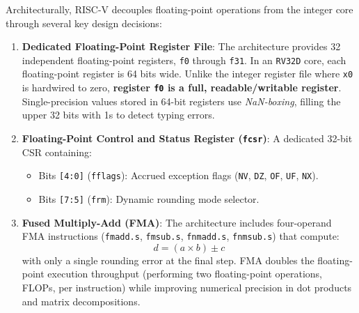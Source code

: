 Architecturally, RISC-V decouples floating-point operations from the integer core through several key design decisions:
\begin{enumerate}
    \item \textbf{Dedicated Floating-Point Register File}: The architecture provides 32 independent floating-point registers, \texttt{f0} through \texttt{f31}. In an \texttt{RV32D} core, each floating-point register is 64 bits wide. Unlike the integer register file where \texttt{x0} is hardwired to zero, \textbf{register \texttt{f0} is a full, readable/writable register}. Single-precision values stored in 64-bit registers use \emph{NaN-boxing}, filling the upper 32 bits with 1s to detect typing errors.
    \item \textbf{Floating-Point Control and Status Register (\texttt{fcsr})}: A dedicated 32-bit CSR containing:
    \begin{itemize}
        \item Bits \texttt{[4:0]} (\texttt{fflags}): Accrued exception flags (\texttt{NV}, \texttt{DZ}, \texttt{OF}, \texttt{UF}, \texttt{NX}).
        \item Bits \texttt{[7:5]} (\texttt{frm}): Dynamic rounding mode selector.
    \end{itemize}
    \item \textbf{Fused Multiply-Add (FMA)}: The architecture includes four-operand FMA instructions (\texttt{fmadd.s}, \texttt{fmsub.s}, \texttt{fnmadd.s}, \texttt{fnmsub.s}) that compute:
    \begin{equation}
    d = (a \times b) \pm c
    \end{equation}
    with only a single rounding error at the final step. FMA doubles the floating-point execution throughput (performing two floating-point operations, FLOPs, per instruction) while improving numerical precision in dot products and matrix decompositions.
\end{enumerate}

